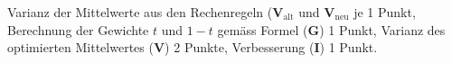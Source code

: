 \begin{bewertung}
Varianz der Mittelwerte aus den Rechenregeln ($\textbf{V}_{\text{alt}}$ und
$\textbf{V}_{\text{neu}}$ je 1 Punkt,
Berechnung der Gewichte $t$ und $1-t$ gemäss Formel ({\bf G}) 1 Punkt,
Varianz des optimierten Mittelwertes ({\bf V}) 2 Punkte,
Verbesserung ({\bf I}) 1 Punkt.
\end{bewertung}


